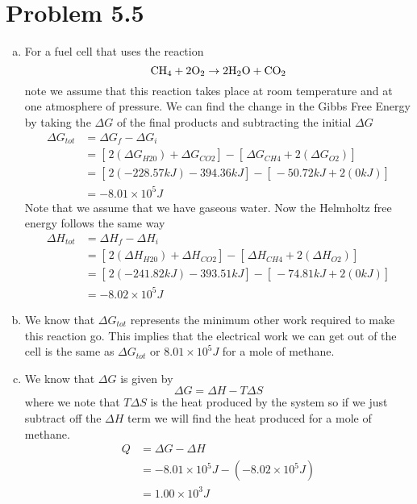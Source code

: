\documentclass[11pt]{article}
\numberwithin{equation}{section}
\begin{document}
\section{Problem 5.5}
\begin{enumerate}[(a)]
\item
For a fuel cell that uses the reaction
$$\textnormal{CH}_4+2\textnormal{O}_2\rightarrow2\textnormal{H}_2\textnormal{O}+\textnormal{CO}_2$$
note we assume that this reaction takes place at room temperature and at one atmosphere of pressure. We can find the change in the Gibbs Free Energy by taking the $\Delta G$ of the final products and subtracting the initial $\Delta G$
\begin{align*}
\Delta G_{tot} &= \Delta G_{f} - \Delta G_{i}\\
&= \left[\frac{}{}2(\Delta G_{H20}) + \Delta G_{CO2}\right] - \left[\frac{}{}\Delta G_{CH4} + 2(\Delta G_{O2})\right]\\
&= \left[\frac{}{}2(-228.57\unit{kJ}) -394.36\unit{kJ}\right] - \left[\frac{}{}-50.72\unit{kJ} + 2(0\unit{kJ})\right]\\
&= -8.01\times10^{5}\unit{J}
\end{align*}
Note that we assume that we have gaseous water. Now the Helmholtz free energy follows the same way
\begin{align*}
\Delta H_{tot} &= \Delta H_{f} - \Delta H_{i}\\
&= \left[\frac{}{}2(\Delta H_{H20}) + \Delta H_{CO2}\right] - \left[\frac{}{}\Delta H_{CH4} + 2(\Delta H_{O2})\right]\\
&= \left[\frac{}{}2(-241.82\unit{kJ}) - 393.51\unit{kJ}\right] - \left[\frac{}{}-74.81\unit{kJ} + 2(0\unit{kJ})\right]\\
&= -8.02\times10^{5}\unit{J}
\end{align*}

\item
We know that $\Delta G_{tot}$ represents the minimum other work required to make this reaction go. This implies that the electrical work we can get out of the cell is the same as $\Delta G_{tot}$ or $8.01\times10^{5}\unit{J}$ for a mole of methane.

\item
We know that $\Delta G$ is given by
$$\Delta G = \Delta H - T\Delta S$$
where we note that $T\Delta S$ is the heat produced by the system so if we just subtract off the $\Delta H$ term we will find the heat produced for a mole of methane.
\begin{align*}
Q &= \Delta G - \Delta H\\
&= -8.01\times10^{5}\unit{J} - (-8.02\times10^{5}\unit{J})\\
&= 1.00\times10^{3}\unit{J}
\end{align*}


\end{enumerate}
\end{document}
